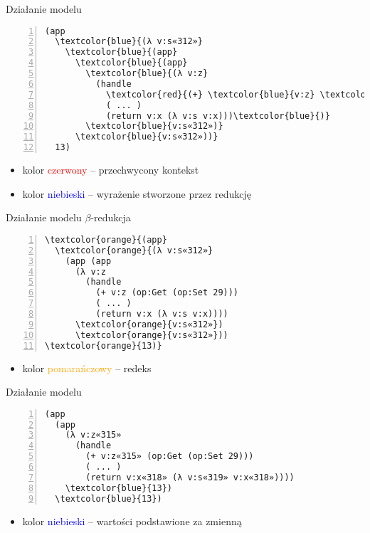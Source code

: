 \documentclass{beamer}
\begin{document}
\begin{frame}[fragile]{Działanie modelu}
\begin{Verbatim}[commandchars=\\\{\},numbers=left]
(app
  \textcolor{blue}{(λ v:s«312»}
    \textcolor{blue}{(app} 
      \textcolor{blue}{(app}
        \textcolor{blue}{(λ v:z}
          (handle
            \textcolor{red}{(+} \textcolor{blue}{v:z} \textcolor{red}{(op:Get (op:Set 29)))}
            ( ... )
            (return v:x (λ v:s v:x)))\textcolor{blue}{)}
        \textcolor{blue}{v:s«312»)}
      \textcolor{blue}{v:s«312»))}
  13)
\end{Verbatim}
\begin{itemize}
  \item kolor \textcolor{red}{czerwony} -- przechwycony kontekst
  \item kolor \textcolor{blue}{niebieski} -- wyrażenie stworzone przez redukcję
\end{itemize}
\end{frame}

\begin{frame}[fragile]{Działanie modelu}
$\beta$-redukcja
\begin{Verbatim}[commandchars=\\\{\},numbers=left]
\textcolor{orange}{(app}
  \textcolor{orange}{(λ v:s«312»}
    (app (app
      (λ v:z
        (handle
          (+ v:z (op:Get (op:Set 29)))
          ( ... )
          (return v:x (λ v:s v:x))))
      \textcolor{orange}{v:s«312»})
      \textcolor{orange}{v:s«312»}))
\textcolor{orange}{13)}
\end{Verbatim}
\begin{itemize}
  \item kolor \textcolor{orange}{pomarańczowy} -- redeks
\end{itemize}
\end{frame}

\begin{frame}[fragile]{Działanie modelu}
\begin{Verbatim}[commandchars=\\\{\},numbers=left]
(app 
  (app
    (λ v:z«315»
      (handle
        (+ v:z«315» (op:Get (op:Set 29)))
        ( ... )
        (return v:x«318» (λ v:s«319» v:x«318»))))
    \textcolor{blue}{13})
  \textcolor{blue}{13})
\end{Verbatim}
\begin{itemize}
  \item kolor \textcolor{blue}{niebieski} -- wartości podstawione za zmienną
\end{itemize}
\end{frame}
\end{document}
